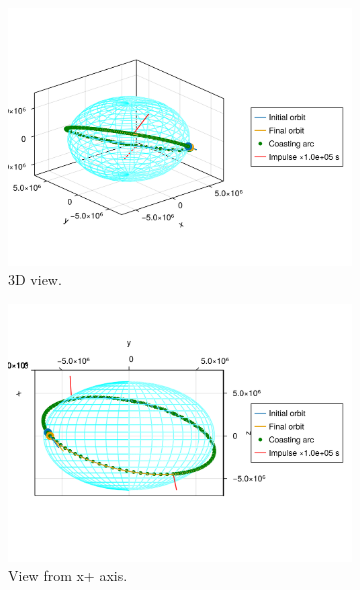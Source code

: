 \begin{figure}[htbp]
    \centering
    \begin{subfigure}{0.49\linewidth}
        \includegraphics[width=\linewidth]{../results/j2/ipv_noncop/CICIC_3d.png}
        \caption{3D view.}
    \end{subfigure}
    \begin{subfigure}{0.49\linewidth}
        \includegraphics[width=\linewidth]{../results/j2/ipv_noncop/CICIC_x+.png}
        \caption{View from x+ axis.}
    \end{subfigure}
    \begin{subfigure}{0.49\linewidth}

\end{subfigure}
\end{figure}
